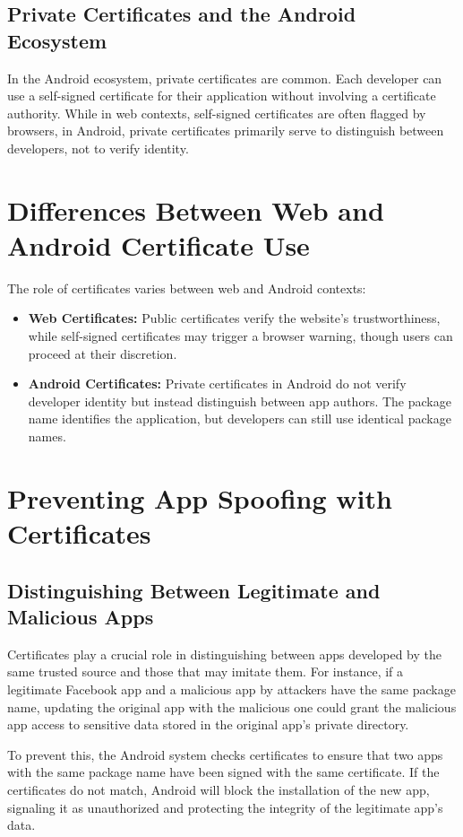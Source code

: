 \documentclass{article}
\begin{document}
\subsection{Private Certificates and the Android Ecosystem}
In the Android ecosystem, private certificates are common. Each developer can use a self-signed certificate for their application without involving a certificate authority. While in web contexts, self-signed certificates are often flagged by browsers, in Android, private certificates primarily serve to distinguish between developers, not to verify identity.

\section{Differences Between Web and Android Certificate Use}
The role of certificates varies between web and Android contexts:
\begin{itemize}
    \item \textbf{Web Certificates:} Public certificates verify the website's trustworthiness, while self-signed certificates may trigger a browser warning, though users can proceed at their discretion.
    \item \textbf{Android Certificates:} Private certificates in Android do not verify developer identity but instead distinguish between app authors. The package name identifies the application, but developers can still use identical package names.
\end{itemize}
\section{Preventing App Spoofing with Certificates}
\subsection{Distinguishing Between Legitimate and Malicious Apps}
Certificates play a crucial role in distinguishing between apps developed by the same trusted source and those that may imitate them. For instance, if a legitimate Facebook app and a malicious app by attackers have the same package name, updating the original app with the malicious one could grant the malicious app access to sensitive data stored in the original app's private directory.

To prevent this, the Android system checks certificates to ensure that two apps with the same package name have been signed with the same certificate. If the certificates do not match, Android will block the installation of the new app, signaling it as unauthorized and protecting the integrity of the legitimate app’s data.
\end{document}
